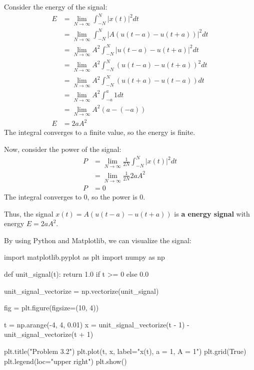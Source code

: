 \documentclass[a4paper, 10pt]{article}
\begin{document}
\begin{solution}
Consider the energy of the signal:
\begin{align*}
    E &= \lim_{N \to \infty} \int_{-N}^{N} |x(t)|^2 dt \\
    &= \lim_{N \to \infty} \int_{-N}^{N} |A(u(t-a) - u(t+a))|^2 dt \\
    &= \lim_{N \to \infty} A^2 \int_{-N}^{N} |u(t-a) - u(t+a)|^2 dt \\
    &= \lim_{N \to \infty} A^2 \int_{-N}^{N} (u(t-a) - u(t+a))^2 dt \\
    &= \lim_{N \to \infty} A^2 \int_{-N}^{N} (u(t+a) - u(t-a)) dt \\
    &= \lim_{N \to \infty} A^2 \int_{-a}^{a} 1 dt \\
    &= \lim_{N \to \infty} A^2 (a - (-a)) \\
    E &= 2aA^2
\end{align*}
The integral converges to a finite value, so the energy is finite.

\vspace{5mm}

Now, consider the power of the signal:
\begin{align*}
    P &= \lim_{N \to \infty} \frac{1}{2N} \int_{-N}^{N} |x(t)|^2 dt \\
    &= \lim_{N \to \infty} \frac{1}{2N} 2aA^2 \\
    P &= 0
\end{align*}
The integral converges to 0, so the power is 0.

\vspace{2mm}

Thus, the signal \( x(t) = A(u(t-a) - u(t+a)) \) is \textbf{a energy signal} with energy \( E = 2aA^2 \).

\vspace{2mm}

By using Python and Matplotlib, we can visualize the signal:
\begin{codingbox}
import matplotlib.pyplot as plt
import numpy as np

def unit_signal(t):
    return 1.0 if t >= 0 else 0.0

unit_signal_vectorize = np.vectorize(unit_signal)

fig = plt.figure(figsize=(10, 4))

t = np.arange(-4, 4, 0.01)
x = unit_signal_vectorize(t - 1) - unit_signal_vectorize(t + 1)

plt.title("Problem 3.2")
plt.plot(t, x, label="x(t), a = 1, A = 1")
plt.grid(True)
plt.legend(loc="upper right")
plt.show()
\end{codingbox}


\end{solution}
\end{document}
